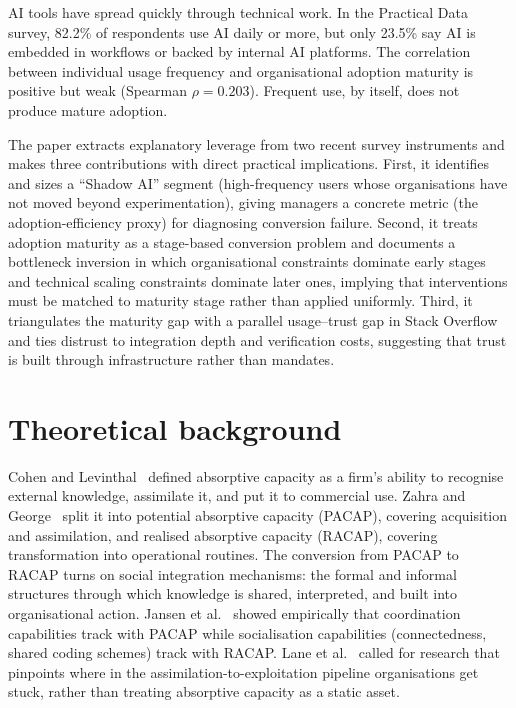 \documentclass[twocolumn]{article}
\begin{document}
AI tools have spread quickly through technical work. In the Practical Data survey, 82.2\% of respondents use AI daily or more, but only 23.5\% say AI is embedded in workflows or backed by internal AI platforms. The correlation between individual usage frequency and organisational adoption maturity is positive but weak (Spearman $\rho{=}0.203$). Frequent use, by itself, does not produce mature adoption.

The paper extracts explanatory leverage from two recent survey instruments and makes three contributions with direct practical implications. First, it identifies and sizes a ``Shadow AI'' segment (high-frequency users whose organisations have not moved beyond experimentation), giving managers a concrete metric (the adoption-efficiency proxy) for diagnosing conversion failure. Second, it treats adoption maturity as a stage-based conversion problem and documents a bottleneck inversion in which organisational constraints dominate early stages and technical scaling constraints dominate later ones, implying that interventions must be matched to maturity stage rather than applied uniformly. Third, it triangulates the maturity gap with a parallel usage--trust gap in Stack Overflow and ties distrust to integration depth and verification costs, suggesting that trust is built through infrastructure rather than mandates.


\section{Theoretical background}

Cohen and Levinthal~\cite{cohen1990absorptive} defined absorptive capacity as a firm's ability to recognise external knowledge, assimilate it, and put it to commercial use. Zahra and George~\cite{zahra2002absorptive} split it into potential absorptive capacity (PACAP), covering acquisition and assimilation, and realised absorptive capacity (RACAP), covering transformation into operational routines. The conversion from PACAP to RACAP turns on social integration mechanisms: the formal and informal structures through which knowledge is shared, interpreted, and built into organisational action. Jansen et al.~\cite{jansen2005managing} showed empirically that coordination capabilities track with PACAP while socialisation capabilities (connectedness, shared coding schemes) track with RACAP. Lane et al.~\cite{lane2006reification} called for research that pinpoints where in the assimilation-to-exploitation pipeline organisations get stuck, rather than treating absorptive capacity as a static asset.
\end{document}
